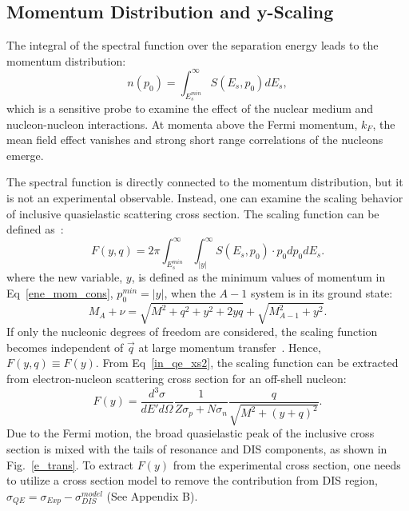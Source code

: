 \subsection{Momentum Distribution and y-Scaling}
The integral of the spectral function over the separation energy leads to the momentum distribution:
\begin{equation}
  n(p_{0}) = \int_{E_{s}^{min}}^{\infty} S(E_{s},p_{0})dE_{s},
  \label{np_mom_eq}
\end{equation}
which is a sensitive probe to examine the effect of the nuclear medium and nucleon-nucleon interactions. At momenta above the Fermi momentum, $k_{F}$, the mean field effect vanishes and strong short range correlations of the nucleons emerge.

The spectral function is directly connected to the momentum distribution, but it is not an experimental observable. Instead, one can examine the scaling behavior~\cite{West1975263} of inclusive quasielastic scattering cross section. The scaling function can be defined as~\cite{PhysRevC.41.R2474,Boffi19931}:
\begin{equation}
  F(y,q) = 2\pi\int_{E_{s}^{min}}^{\infty} \int_{|y|}^{\infty}S(E_{s},p_{0})\cdot p_{0}dp_{0}dE_{s}.
  \label{fy_scaling_eq}
\end{equation}
where the new variable, $y$, is defined as the minimum values of momentum in Eq~\eqref{ene_mom_cons}, $p_{0}^{min}=|y|$, when the $A-1$ system is in its ground state:
\begin{equation}
  M_{A}+\nu = \sqrt{M^{2}+q^{2}+y^{2}+2yq}+\sqrt{M_{A-1}^{2}+y^{2}}.
  \label{y_enegy_conserv}
\end{equation} 
If only the nucleonic degrees of freedom are considered, the scaling function becomes independent of $\vec{q}$ at large momentum transfer~\cite{Boffi19931}. Hence, $F(y,q)\equiv F(y)$. From Eq~\eqref{in_qe_xs2}, the scaling function can be extracted from electron-nucleon scattering cross section for an off-shell nucleon:
\begin{equation}
  F(y)=\frac{d^{3}\sigma}{dE' d\Omega } \frac{1}{Z\sigma_{p}+N\sigma_{n}} \frac{q}{\sqrt{M^{2}+(y+q)^{2}}}.
  \label{fy_scaling_eq2}
\end{equation}
Due to the Fermi motion, the broad quasielastic peak of the inclusive cross section is mixed with the tails of resonance and DIS components, as shown in Fig.~\ref{e_trans}. To extract $F(y)$ from the experimental cross section, one needs to utilize a cross section model to remove the contribution from DIS region, $\sigma_{QE}=\sigma_{Exp}-\sigma_{DIS}^{model}$ (See Appendix B).

